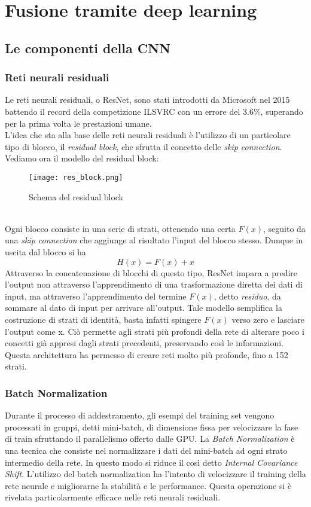\chapter{Fusione tramite deep learning}

\section{Le componenti della CNN}
\subsection{Reti neurali residuali}
Le reti neurali residuali, o ResNet, sono stati introdotti da Microsoft nel 2015 battendo il record della competizione ILSVRC con un errore del 3.6\%, superando per la prima volta le prestazioni umane.\\
L'idea che sta alla base delle reti neurali residuali è l'utilizzo di un particolare tipo di blocco, il \textit{residual block}, che sfrutta il concetto delle \textit{skip connection}. \\
Vediamo ora il modello del residual block:
\begin{figure}[ht]
    \centering
    \texttt{[image: res\_block.png]}
    \caption[Residual block]{Schema del residual block}
\end{figure}\\
Ogni blocco consiste in una serie di strati, ottenendo una certa $F(x)$, seguito da una \textit{skip connection} che aggiunge al risultato l'input del blocco stesso. Dunque in uscita dal blocco si ha
$$ H(x)=F(x)+x $$
Attraverso la concatenazione di blocchi di questo tipo, ResNet impara a predire l'output non attraverso l'apprendimento di una trasformazione diretta dei dati di input, ma attraverso l'apprendimento del termine $F(x)$, detto \textit{residuo}, da sommare al dato di input per arrivare all'output. Tale modello semplifica la costruzione di strati di identità, basta infatti spingere $F(x)$ verso zero e lasciare l'output come x. Ciò permette agli strati più profondi della rete di alterare poco i concetti già appresi dagli strati precedenti, preservando così le informazioni. Questa architettura ha permesso di creare reti molto più profonde, fino a 152 strati.

\subsection{Batch Normalization}
Durante il processo di addestramento, gli esempi del training set vengono processati in gruppi, detti mini-batch, di dimensione fissa per velocizzare la fase di train sfruttando il parallelismo offerto dalle GPU. La \textit{Batch Normalization} è una tecnica che consiste nel normalizzare i dati del mini-batch ad ogni strato intermedio della rete. In questo modo si riduce il così detto \textit{Internal Covariance Shift}. L'utilizzo del batch normalization ha l'intento di velocizzare il training della rete neurale e migliorarne la stabilità e le performance. Questa operazione si è rivelata particolarmente efficace nelle reti neurali residuali.

